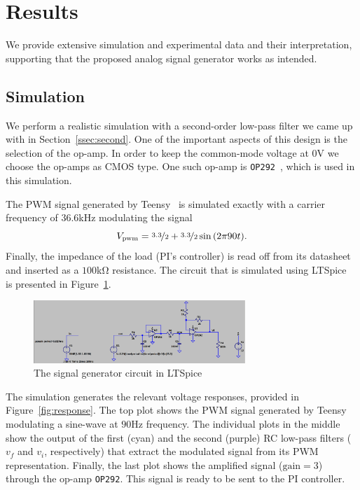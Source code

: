\vspace{-1em}
\section{Results}
\vspace{-1em}

We provide extensive simulation and experimental data and their interpretation,
supporting that the proposed analog signal generator works as intended.

\vspace{-1em}
\subsection{Simulation}
\vspace{-1em}

We perform a realistic simulation with a second-order low-pass filter we came up
with in Section~\ref{ssec:second}. One of the important aspects of this design
is the selection of the op-amp. In order to keep the common-mode voltage at
$0$\unit{\volt} we choose the op-amps as CMOS type. One such op-amp is
\texttt{OP292}~\cite{op292}, which is used in this simulation.

The PWM signal generated by Teensy~\cite{teensy} is simulated exactly with a
carrier frequency of $36.6$\unit{\kilo\hertz} modulating the signal \[
V_{\text{pwm}} = \nicefrac{3.3}{2} + \nicefrac{3.3}{2}\sin{(2\pi 90 t)}.\]
Finally, the impedance of the load (PI's controller) is read off from its
datasheet and inserted as a $100$\unit{\kilo\ohm} resistance. The circuit that
is simulated using LTSpice~\cite{ltspice} is presented in
Figure~\ref{fig:real_sig_gen}.

\begin{figure}[htb] 
\includegraphics[width=8cm]{./figures/circuit.png}
\caption{The signal generator circuit in LTSpice} 
\label{fig:real_sig_gen}
\end{figure}

The simulation generates the relevant voltage responses, provided in
Figure~\ref{fig:response}. The top plot shows the PWM signal generated by Teensy
modulating a sine-wave at $90$\unit{\hertz} frequency. The individual plots in
the middle show the output of the first (cyan) and the second (purple) RC
low-pass filters ($v_f$ and $v_i$, respectively) that extract the modulated
signal from its PWM representation. Finally, the last plot shows the amplified
signal ($\text{gain}=3$) through the op-amp \texttt{OP292}. This signal is ready
to be sent to the PI controller.

